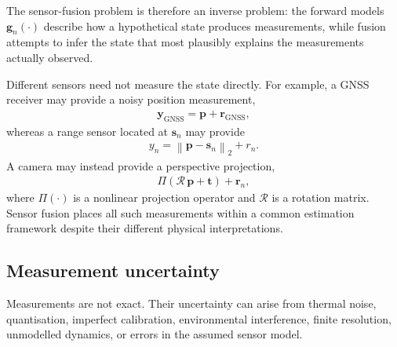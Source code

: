 The sensor-fusion problem is therefore an inverse problem: the forward models $\mathbf{g}_n(\cdot)$ describe how a hypothetical state produces measurements, while fusion attempts to infer the state that most plausibly explains the measurements actually observed. 

Different sensors need not measure the state directly. For example, a GNSS receiver may provide a noisy position measurement,
\begin{align*}
\mathbf{y}_{\mathrm{GNSS}}=\mathbf{p}+\mathbf{r}_{\mathrm{GNSS}},
\end{align*}
whereas a range sensor located at $\mathbf{s}_n$ may provide
\begin{align*}
y_n=\left\|\mathbf{p}-\mathbf{s}_n\right\|_2+r_n.
\end{align*}
A camera may instead provide a perspective projection,
\begin{align*}
\Pi\left(\boldsymbol{\mathcal{R}}\,\mathbf{p}+\mathbf{t}\right) +\mathbf{r}_n,
\end{align*}
where $\Pi(\cdot)$ is a nonlinear projection operator and $\boldsymbol{\mathcal{R}}$ is a rotation matrix. Sensor fusion places all such measurements within a common estimation framework despite their different physical interpretations.

\subsection{Measurement uncertainty}
Measurements are not exact. Their uncertainty can arise from thermal noise, quantisation, imperfect calibration, environmental interference, finite resolution, unmodelled dynamics, or errors in the assumed sensor model.

